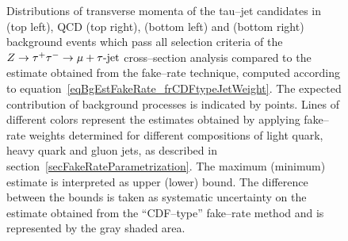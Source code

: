 \begin{figure}[t]
\begin{center}
\begin{picture}
\end{picture}
\caption[Tau--jet transverse momentum in the Fake--rate method]{\captiontext
Distributions of transverse momenta of the tau--jet candidates in \WpJets (top
left), QCD (top right), \ttbarpJets (bottom left) and \ZMM (bottom right)
background events which pass all selection criteria of the $\ZTT \to \mu +
\tau\mbox{-jet}$ cross--section analysis compared to the estimate obtained from
the fake--rate technique, computed according to
equation~\ref{eqBgEstFakeRate_frCDFtypeJetWeight}.  The expected contribution of
background processes is indicated by points.  Lines of different colors
represent the estimates obtained by applying fake--rate weights determined for
different compositions of light quark, heavy quark and gluon jets, as described
in section~\ref{secFakeRateParametrization}.  The maximum (minimum) estimate is
interpreted as upper (lower) bound.  The difference between the bounds is taken
as systematic uncertainty on the estimate obtained from the ``CDF--type''
fake--rate method and is represented by the gray shaded area.}
\label{figBgEstFakeRate_frCDFtypeResults_tauJetPt}
\end{center}
\end{figure} 

